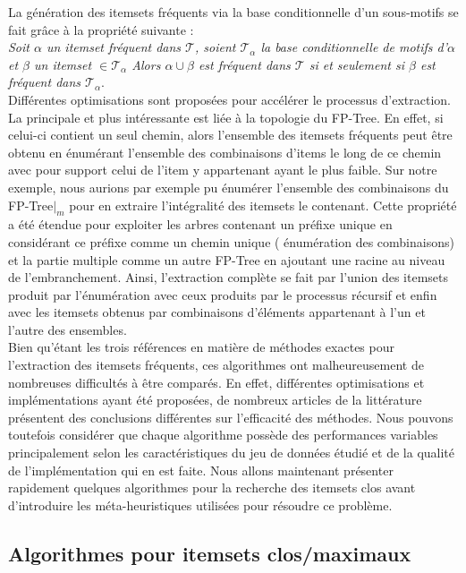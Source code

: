 \documentclass[a4paper,10pt]{report}
\begin{document}
La génération des itemsets fréquents via la base conditionnelle d'un sous-motifs se fait grâce à la propriété suivante : \\

\emph{Soit $\alpha$ un itemset fréquent dans $\mathcal{T}$, soient $\mathcal{T}_{\alpha}$ la base conditionnelle de motifs d'$\alpha$ et $\beta$ un itemset $\in \mathcal{T}_{\alpha}$ Alors $\alpha \cup \beta$ est fréquent dans $\mathcal{T}$ si et seulement si $\beta$ est fréquent dans $\mathcal{T}_{\alpha}$}. \\

Différentes optimisations sont proposées pour accélérer le processus d'extraction. La principale et plus intéressante est liée à la topologie du FP-Tree. En effet, si celui-ci contient un seul chemin, alors l'ensemble des itemsets fréquents peut être obtenu en énumérant l'ensemble des combinaisons d'items le long de ce chemin avec pour support celui de l'item y appartenant ayant le plus faible. Sur notre exemple, nous aurions par exemple pu énumérer l'ensemble des combinaisons du FP-Tree$|_{m}$ pour en extraire l'intégralité des itemsets le contenant. Cette propriété a été étendue pour exploiter les arbres contenant un préfixe unique en considérant ce préfixe comme un chemin unique ( énumération des combinaisons) et la partie multiple comme un autre FP-Tree en ajoutant une racine au niveau de l'embranchement. Ainsi, l'extraction complète se fait par l'union des itemsets produit par l'énumération avec ceux produits par le processus récursif et enfin avec les itemsets obtenus par combinaisons d'éléments appartenant à l'un et l'autre des ensembles. \\

Bien qu'étant les trois références en matière de méthodes exactes pour l'extraction des itemsets fréquents, ces algorithmes ont malheureusement de nombreuses difficultés à être comparés. En effet, différentes optimisations et implémentations ayant été proposées, de nombreux articles de la littérature présentent des conclusions différentes sur l'efficacité des méthodes. Nous pouvons toutefois considérer que chaque algorithme possède des performances variables principalement selon les caractéristiques du jeu de données étudié et de la qualité de l'implémentation qui en est faite. Nous allons maintenant présenter rapidement quelques algorithmes pour la recherche des itemsets clos avant d'introduire les méta-heuristiques utilisées pour résoudre ce problème.

\subsection{Algorithmes pour itemsets clos/maximaux}

\cite{PEI00} 
\cite{BOR03} 
\cite{PEI01} 


  
  
\end{document}
